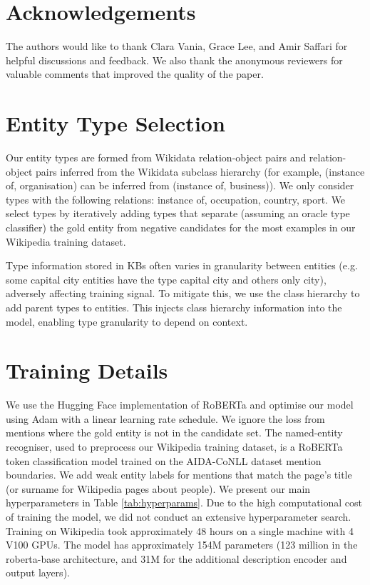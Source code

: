 \documentclass[11pt]{article}
\begin{document}
\section*{Acknowledgements}
The authors would like to thank Clara Vania, Grace Lee, and Amir Saffari for helpful discussions and feedback. We also thank the anonymous reviewers for valuable comments that improved the quality of the paper.


\clearpage





\clearpage

\appendix


\section{Entity Type Selection}
\label{sec:type-selection-details}
Our entity types are formed from Wikidata relation-object pairs and relation-object pairs inferred from the Wikidata subclass hierarchy (for example, (instance of, organisation) can be inferred from (instance of, business)). We only consider types with the following relations: instance of, occupation, country, sport. We select types by iteratively adding types that separate (assuming an oracle type classifier) the gold entity from negative candidates for the most examples in our Wikipedia training dataset.


Type information stored in KBs often varies in granularity between entities (e.g. some capital city entities have the type capital city and others only city),  adversely affecting training signal. To mitigate this, we use the class hierarchy to add parent types to entities. This injects class hierarchy information into the model, enabling type granularity to depend on context. 





\section{Training Details}
\label{sec:training-details}
We use the Hugging Face implementation of RoBERTa \cite{huggingface} and optimise our model using Adam \cite{adam} with a linear learning rate schedule. We ignore the loss from mentions where the gold entity is not in the candidate set. The named-entity recogniser, used to preprocess our Wikipedia training dataset, is a RoBERTa token classification model trained on the AIDA-CoNLL dataset mention boundaries. We add weak  entity labels for mentions that match the page's title (or surname for Wikipedia pages about people). We present our main hyperparameters in Table \ref{tab:hyperparams}. Due to the high computational cost of training the model, we did not conduct an extensive hyperparameter search. Training on Wikipedia took approximately 48 hours on a single machine with 4 V100 GPUs. The model has approximately 154M parameters (123 million in the roberta-base architecture, and 31M for the additional description encoder and output layers). 
\end{document}
